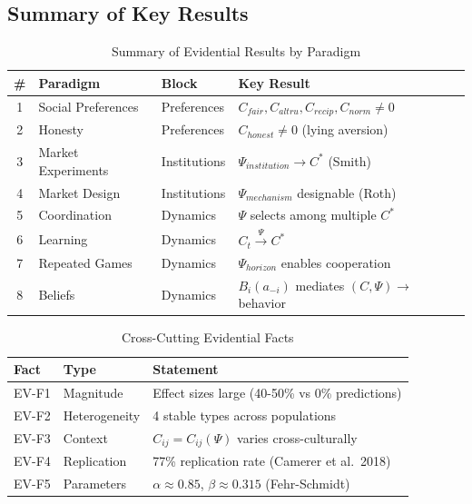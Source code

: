 

\subsection{Summary of Key Results}
\label{sec:EV-results}

\begin{table}[htbp]
\centering
\caption{Summary of Evidential Results by Paradigm}
\label{tab:EV-results}
\renewcommand{\arraystretch}{1.2}
\small
\begin{tabular}{@{}clll@{}}
\toprule
\textbf{\#} & \textbf{Paradigm} & \textbf{Block} & \textbf{Key Result} \\
\midrule
1 & Social Preferences & Preferences & $C_{fair}, C_{altru}, C_{recip}, C_{norm} \neq 0$ \\
2 & Honesty & Preferences & $C_{honest} \neq 0$ (lying aversion) \\
3 & Market Experiments & Institutions & $\Psi_{institution} \to C^*$ (Smith) \\
4 & Market Design & Institutions & $\Psi_{mechanism}$ designable (Roth) \\
5 & Coordination & Dynamics & $\Psi$ selects among multiple $C^*$ \\
6 & Learning & Dynamics & $C_t \xrightarrow{\Psi} C^*$ \\
7 & Repeated Games & Dynamics & $\Psi_{horizon}$ enables cooperation \\
8 & Beliefs & Dynamics & $B_i(a_{-i})$ mediates $(C, \Psi) \to$ behavior \\
\bottomrule
\end{tabular}
\end{table}

\begin{table}[htbp]
\centering
\caption{Cross-Cutting Evidential Facts}
\label{tab:EV-facts}
\renewcommand{\arraystretch}{1.2}
\begin{tabular}{@{}llp{6cm}@{}}
\toprule
\textbf{Fact} & \textbf{Type} & \textbf{Statement} \\
\midrule
EV-F1 & Magnitude & Effect sizes large (40-50\% vs 0\% predictions) \\
EV-F2 & Heterogeneity & 4 stable types across populations \\
EV-F3 & Context & $C_{ij} = C_{ij}(\Psi)$ varies cross-culturally \\
EV-F4 & Replication & 77\% replication rate (Camerer et al.\ 2018) \\
EV-F5 & Parameters & $\alpha \approx 0.85$, $\beta \approx 0.315$ (Fehr-Schmidt) \\
\bottomrule
\end{tabular}
\end{table}


